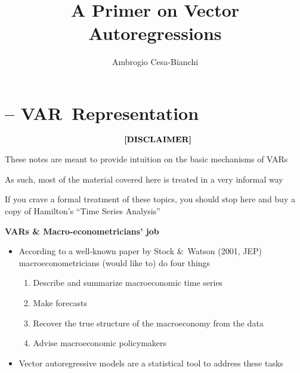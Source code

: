 \documentclass[10pt,handout]{beamer}
\begin{document}
\title[VAR models]{\textbf{A Primer on Vector Autoregressions}}
\author{Ambrogio Cesa-Bianchi}
\date{}
\maketitle

\section{ -- VAR\ Representation}

\begin{frame}
\begin{equation*}
\text{\textbf{[DISCLAIMER]}}
\end{equation*}

These notes are meant to provide intuition on the basic mechanisms of
VARs\bigskip \pause

As such, most of the material covered here is treated in a very informal
way\bigskip \pause

If you crave a formal treatment of these topics, you should stop here and
buy a copy of Hamilton's \textquotedblleft Time Series
Analysis\textquotedblright
\end{frame}

\vspace{.1cm}

\begin{frame}
{\textbf{VARs \& Macro-econometricians' job}}

\begin{itemize}
\item According to a well-known paper by Stock \&\ Watson (2001, JEP)
macroeconometricians (would like to) do four things\smallskip

\begin{enumerate}
\item Describe and summarize macroeconomic time series\smallskip \pause

\item Make forecasts\smallskip \pause

\item Recover the true structure of the macroeconomy from the data\smallskip 
\pause

\item Advise macroeconomic policymakers\medskip \pause
\end{enumerate}

\item Vector autoregressive models are a statistical tool to address these
tasks
\end{itemize}
\end{frame}
\end{document}
